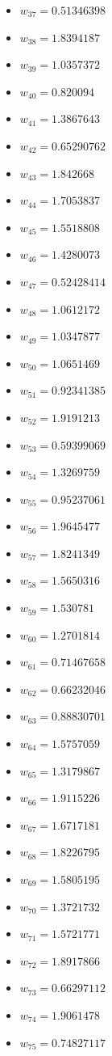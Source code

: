 \documentclass[11pt]{article}
\begin{document}
\begin{itemize}
\item $w_{37} = 0.51346398$
\item $w_{38} = 1.8394187$
\item $w_{39} = 1.0357372$
\item $w_{40} = 0.820094$
\item $w_{41} = 1.3867643$
\item $w_{42} = 0.65290762$
\item $w_{43} = 1.842668$
\item $w_{44} = 1.7053837$
\item $w_{45} = 1.5518808$
\item $w_{46} = 1.4280073$
\item $w_{47} = 0.52428414$
\item $w_{48} = 1.0612172$
\item $w_{49} = 1.0347877$
\item $w_{50} = 1.0651469$
\item $w_{51} = 0.92341385$
\item $w_{52} = 1.9191213$
\item $w_{53} = 0.59399069$
\item $w_{54} = 1.3269759$
\item $w_{55} = 0.95237061$
\item $w_{56} = 1.9645477$
\item $w_{57} = 1.8241349$
\item $w_{58} = 1.5650316$
\item $w_{59} = 1.530781$
\item $w_{60} = 1.2701814$
\item $w_{61} = 0.71467658$
\item $w_{62} = 0.66232046$
\item $w_{63} = 0.88830701$
\item $w_{64} = 1.5757059$
\item $w_{65} = 1.3179867$
\item $w_{66} = 1.9115226$
\item $w_{67} = 1.6717181$
\item $w_{68} = 1.8226795$
\item $w_{69} = 1.5805195$
\item $w_{70} = 1.3721732$
\item $w_{71} = 1.5721771$
\item $w_{72} = 1.8917866$
\item $w_{73} = 0.66297112$
\item $w_{74} = 1.9061478$
\item $w_{75} = 0.74827117$

\end{itemize}
\end{document}
